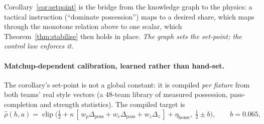 \documentclass[11pt]{article}
\theoremstyle{definition}
\theoremstyle{remark}
\begin{document}
Corollary~\ref{cor:setpoint} is the bridge from the knowledge graph to the physics: a tactical instruction (``dominate possession'') maps to a desired share, which maps through the monotone relation above to one scalar, which Theorem~\ref{thm:stabilise} then holds in place. \emph{The graph sets the set-point; the control law enforces it.}

\paragraph{Matchup-dependent calibration, learned rather than hand-set.} The corollary's set-point is not a global constant: it is compiled \emph{per fixture} from both teams' real style vectors (a 48-team library of measured possession, pass-completion and strength statistics). The compiled target is
\[
\hat\rho(h,a)=\operatorname{clip}\!\big(\tfrac12+\kappa\,[\,w_p\Delta_{\mathrm{poss}}+w_c\Delta_{\mathrm{pass}}+w_z\Delta_z\,]+\eta_{\mathrm{home}},\ \tfrac12\pm b\big),\qquad b=0.065,
\]
\end{document}

